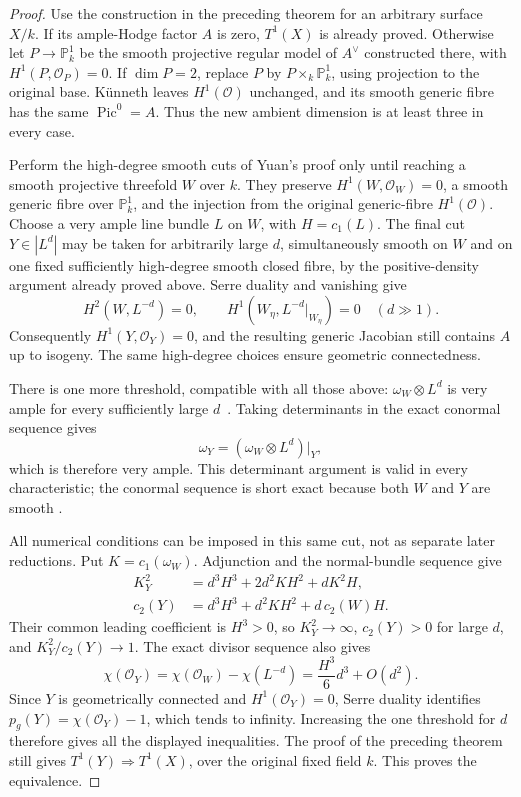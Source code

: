\begin{proof}
Use the construction in the preceding theorem for an arbitrary
surface \(X/k\).  If its ample-Hodge factor \(A\) is zero,
\(T^1(X)\) is already proved.  Otherwise let
\(P\to\mathbb P^1_k\) be the smooth projective regular model
of \(A^\vee\) constructed there, with \(H^1(P,\mathcal O_P)=0\).
If \(\dim P=2\), replace \(P\) by \(P\times_k\mathbb P^1_k\),
using projection to the original base.  K\"unneth leaves
\(H^1(\mathcal O)\) unchanged, and its smooth generic fibre has
the same \(\operatorname{Pic}^0=A\).  Thus the new ambient
dimension is at least three in every case.

Perform the high-degree smooth cuts of Yuan's proof only until
reaching a smooth projective threefold \(W\) over \(k\).
They preserve \(H^1(W,\mathcal O_W)=0\), a smooth generic
fibre over \(\mathbb P^1_k\), and the injection from the
original generic-fibre \(H^1(\mathcal O)\).
Choose a very ample line bundle \(L\) on \(W\), with
\(H=c_1(L)\).  The final cut \(Y\in|L^d|\) may be taken
for arbitrarily large \(d\), simultaneously smooth on \(W\)
and on one fixed sufficiently high-degree smooth closed fibre,
by the positive-density argument already proved above.
Serre duality and vanishing give
\[
 H^2(W,L^{-d})=0,\qquad
 H^1(W_\eta,L^{-d}|_{W_\eta})=0
 \quad(d\gg1).
\]
Consequently \(H^1(Y,\mathcal O_Y)=0\), and the resulting
generic Jacobian still contains \(A\) up to isogeny.
The same high-degree choices ensure geometric connectedness.

There is one more threshold, compatible with all those above:
\(\omega_W\otimes L^d\) is very ample for every sufficiently
large \(d\)~\cite[Lemma~29.40.8, tag 0FVC]{BStacksCanonicalCuts}.
Taking determinants in the exact conormal sequence gives
\[
                  \omega_Y=(\omega_W\otimes L^d)|_Y,
\]
which is therefore very ample.  This determinant argument is
valid in every characteristic; the conormal sequence is short
exact because both \(W\) and \(Y\) are smooth
\cite[section~37.63, tag 06BB]{BStacksCanonicalCuts}.

All numerical conditions can be imposed in this same cut, not
as separate later reductions.  Put \(K=c_1(\omega_W)\).
Adjunction and the normal-bundle sequence give
\[
 \begin{aligned}
 K_Y^2&=d^3H^3+2d^2KH^2+dK^2H,\\
 c_2(Y)&=d^3H^3+d^2KH^2+d\,c_2(W)H.
 \end{aligned}
\]
Their common leading coefficient is \(H^3>0\), so
\(K_Y^2\to\infty\), \(c_2(Y)>0\) for large \(d\),
and \(K_Y^2/c_2(Y)\to1\).
The exact divisor sequence also gives
\[
 \chi(\mathcal O_Y)
   =\chi(\mathcal O_W)-\chi(L^{-d})
   =\frac{H^3}{6}d^3+O(d^2).
\]
Since \(Y\) is geometrically connected and \(H^1(\mathcal O_Y)=0\),
Serre duality identifies
\(p_g(Y)=\chi(\mathcal O_Y)-1\), which tends to infinity.
Increasing the one threshold for \(d\) therefore gives all
the displayed inequalities.  The proof of the preceding theorem
still gives \(T^1(Y)\Rightarrow T^1(X)\), over the original
fixed field \(k\).  This proves the equivalence.
\end{proof}

